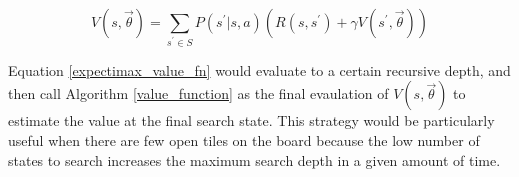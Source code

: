 \documentclass{article}
\begin{document}
\begin{equation}
\label{expectimax_value_fn}
V(s, \vec{\theta}) = \sum_{s^\prime \in S} P(s^\prime|s, a)(R(s, s^\prime) + \gamma V(s^\prime, \vec{\theta}))
\end{equation}

Equation \ref{expectimax_value_fn} would evaluate to a certain recursive depth, and then call Algorithm \ref{value_function} as the final evaulation of $V(s, \vec{\theta})$ to estimate the value at the final search state.  This strategy would be particularly useful when there are few open tiles on the board because the low number of states to search increases the maximum search depth in a given amount of time.





\end{document}
